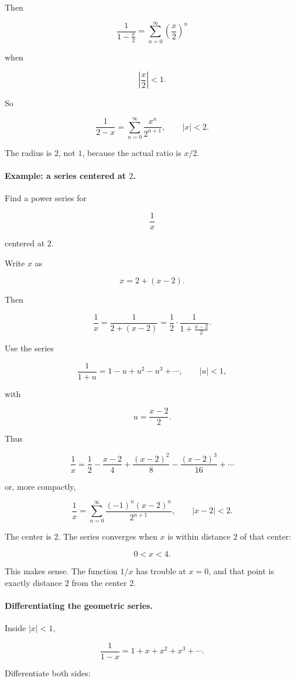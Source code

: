 Then

\[
\frac1{1-\frac{x}{2}}
=
\sum_{n=0}^{\infty}\left(\frac{x}{2}\right)^n
\]

when

\[
\left|\frac{x}{2}\right|<1.
\]

So

\[
\boxed{
\frac1{2-x}
=
\sum_{n=0}^{\infty}\frac{x^n}{2^{n+1}},
\qquad |x|<2.
}
\]

The radius is \(2\), not \(1\), because the actual ratio is \(x/2\).

\paragraph{Example: a series centered at \(2\).}
Find a power series for

\[
\frac1x
\]

centered at \(2\).

Write \(x\) as

\[
x=2+(x-2).
\]

Then

\[
\frac1x
=
\frac1{2+(x-2)}
=
\frac12\cdot \frac1{1+\frac{x-2}{2}}.
\]

Use the series

\[
\frac1{1+u}=1-u+u^2-u^3+\cdots,
\qquad |u|<1,
\]

with

\[
u=\frac{x-2}{2}.
\]

Thus

\[
\boxed{
\frac1x
=
\frac12
-\frac{x-2}{4}
+\frac{(x-2)^2}{8}
-\frac{(x-2)^3}{16}
+\cdots
}
\]

or, more compactly,

\[
\boxed{
\frac1x
=
\sum_{n=0}^{\infty}
\frac{(-1)^n(x-2)^n}{2^{n+1}},
\qquad |x-2|<2.
}
\]

The center is \(2\).  The series converges when \(x\) is within distance \(2\) of that
center:

\[
0<x<4.
\]

This makes sense.  The function \(1/x\) has trouble at \(x=0\), and that point is exactly
distance \(2\) from the center \(2\).

\paragraph{Differentiating the geometric series.}
Inside \(|x|<1\),

\[
\frac1{1-x}=1+x+x^2+x^3+\cdots.
\]

Differentiate both sides:

